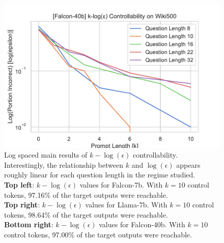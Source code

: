 \documentclass{article} %
\begin{document}
\begin{figure}[ht]
\begin{minipage}[b]{0.48\textwidth}
    \end{minipage}
    \vspace{1em} %
    \begin{minipage}[b]{0.48\textwidth}
        \caption{
            Log spaced main results of $k-\log(\epsilon)$ controllability. Interestingly, the relationship between $k$ and $\log(\epsilon)$ appears roughly linear for each question length in the regime studied. \\
            \textbf{Top left}: $k-\log(\epsilon)$ values for Falcon-7b. With $k=10$ control tokens, 97.16\% of the target outputs were reachable. \\
            \textbf{Top right}: $k-\log(\epsilon)$ values for Llama-7b. With $k=10$ control tokens, 98.64\% of the target outputs were reachable. \\
            \textbf{Bottom right}: $k-\log(\epsilon)$ values for Falcon-40b. With $k=10$ control tokens, 97.00\% of the target outputs were reachable.
            \label{fig:log_main}
        }
    \end{minipage}
    \hfill
    \begin{minipage}[b]{0.48\textwidth}
        \includegraphics[width=\textwidth]{old_figs/falcon_40b/log_line_plot.pdf}
    \end{minipage}
\end{figure}
\end{document}
